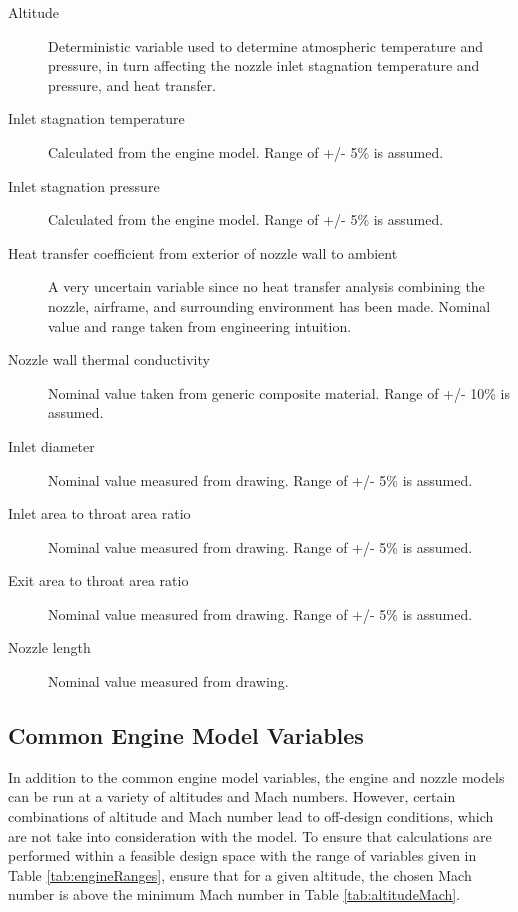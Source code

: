 \documentclass{article}
\begin{document}
\begin{description}
\item[Altitude] Deterministic variable used to determine atmospheric temperature and pressure, in turn affecting the nozzle inlet stagnation temperature and pressure, and heat transfer.
\item[Inlet stagnation temperature] Calculated from the engine model. Range of +/- 5\% is assumed.
\item[Inlet stagnation pressure] Calculated from the engine model. Range of +/- 5\% is assumed.
\item[Heat transfer coefficient from exterior of nozzle wall to ambient] A very uncertain variable since no heat transfer analysis combining the nozzle, airframe, and surrounding environment has been made. Nominal value and range taken from engineering intuition.
\item[Nozzle wall thermal conductivity] Nominal value taken from generic composite material. Range of +/- 10\% is assumed.
\item[Inlet diameter] Nominal value measured from drawing.  Range of +/- 5\% is assumed.
\item[Inlet area to throat area ratio] Nominal value measured from drawing.  Range of +/- 5\% is assumed.
\item[Exit area to throat area ratio] Nominal value measured from drawing.  Range of +/- 5\% is assumed.
\item[Nozzle length] Nominal value measured from drawing.
\end{description}


\subsection{Common Engine Model Variables}

In addition to the common engine model variables, the engine and nozzle models can be run at a variety of altitudes and Mach numbers. However, certain combinations of altitude and Mach number lead to off-design conditions, which are not take into consideration with the model. To ensure that calculations are performed within a feasible design space with the range of variables given in Table \ref{tab:engineRanges}, ensure that for a given altitude, the chosen Mach number is above the minimum Mach number in Table \ref{tab:altitudeMach}.
\end{document}
